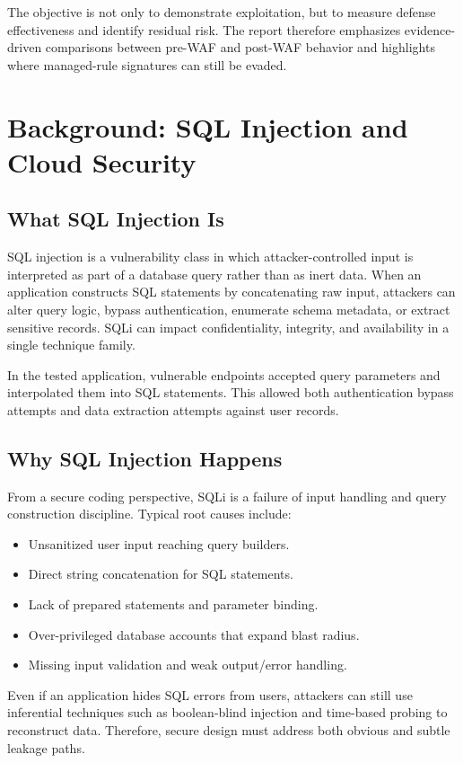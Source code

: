\documentclass[12pt,a4paper]{article}
\begin{document}
The objective is not only to demonstrate exploitation, but to measure defense effectiveness and identify residual risk. The report therefore emphasizes evidence-driven comparisons between pre-WAF and post-WAF behavior and highlights where managed-rule signatures can still be evaded.

\section{Background: SQL Injection and Cloud Security}
\subsection{What SQL Injection Is}
SQL injection is a vulnerability class in which attacker-controlled input is interpreted as part of a database query rather than as inert data. When an application constructs SQL statements by concatenating raw input, attackers can alter query logic, bypass authentication, enumerate schema metadata, or extract sensitive records. SQLi can impact confidentiality, integrity, and availability in a single technique family.

In the tested application, vulnerable endpoints accepted query parameters and interpolated them into SQL statements. This allowed both authentication bypass attempts and data extraction attempts against user records.

\subsection{Why SQL Injection Happens}
From a secure coding perspective, SQLi is a failure of input handling and query construction discipline. Typical root causes include:
\begin{itemize}
  \item Unsanitized user input reaching query builders.
  \item Direct string concatenation for SQL statements.
  \item Lack of prepared statements and parameter binding.
  \item Over-privileged database accounts that expand blast radius.
  \item Missing input validation and weak output/error handling.
\end{itemize}

Even if an application hides SQL errors from users, attackers can still use inferential techniques such as boolean-blind injection and time-based probing to reconstruct data. Therefore, secure design must address both obvious and subtle leakage paths.
\end{document}
